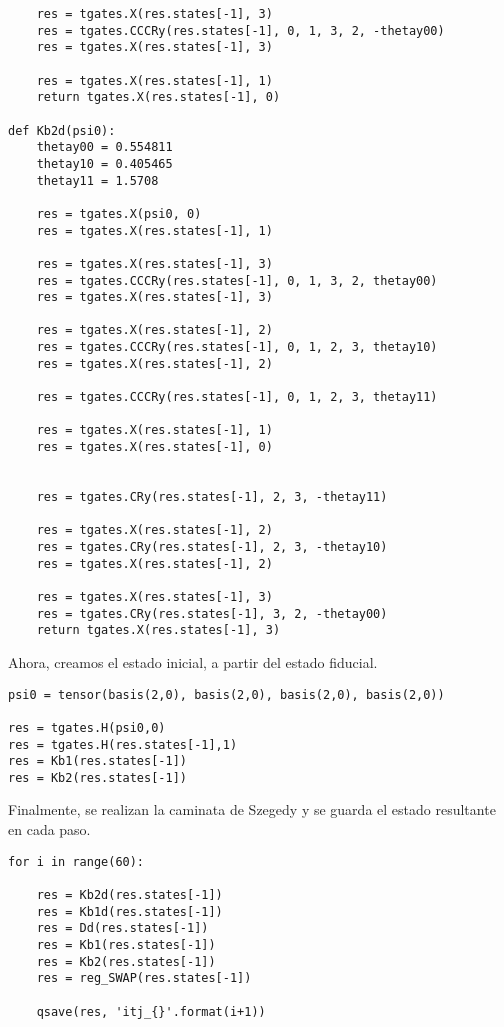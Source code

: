\begin{verbatim}
    res = tgates.X(res.states[-1], 3)
    res = tgates.CCCRy(res.states[-1], 0, 1, 3, 2, -thetay00)
    res = tgates.X(res.states[-1], 3)

    res = tgates.X(res.states[-1], 1)
    return tgates.X(res.states[-1], 0)

def Kb2d(psi0):
    thetay00 = 0.554811
    thetay10 = 0.405465
    thetay11 = 1.5708

    res = tgates.X(psi0, 0)
    res = tgates.X(res.states[-1], 1)

    res = tgates.X(res.states[-1], 3)
    res = tgates.CCCRy(res.states[-1], 0, 1, 3, 2, thetay00)
    res = tgates.X(res.states[-1], 3)

    res = tgates.X(res.states[-1], 2)
    res = tgates.CCCRy(res.states[-1], 0, 1, 2, 3, thetay10)
    res = tgates.X(res.states[-1], 2)

    res = tgates.CCCRy(res.states[-1], 0, 1, 2, 3, thetay11)

    res = tgates.X(res.states[-1], 1)
    res = tgates.X(res.states[-1], 0)


    res = tgates.CRy(res.states[-1], 2, 3, -thetay11)

    res = tgates.X(res.states[-1], 2)
    res = tgates.CRy(res.states[-1], 2, 3, -thetay10)
    res = tgates.X(res.states[-1], 2)

    res = tgates.X(res.states[-1], 3)
    res = tgates.CRy(res.states[-1], 3, 2, -thetay00)
    return tgates.X(res.states[-1], 3)
\end{verbatim}

Ahora, creamos el estado inicial, a partir del estado fiducial.

\begin{verbatim}
psi0 = tensor(basis(2,0), basis(2,0), basis(2,0), basis(2,0))

res = tgates.H(psi0,0)
res = tgates.H(res.states[-1],1)
res = Kb1(res.states[-1])
res = Kb2(res.states[-1])
\end{verbatim}

Finalmente, se realizan la caminata de Szegedy y se guarda el estado resultante en cada paso.

\begin{verbatim}
for i in range(60):
    
    res = Kb2d(res.states[-1])
    res = Kb1d(res.states[-1])
    res = Dd(res.states[-1])
    res = Kb1(res.states[-1])
    res = Kb2(res.states[-1])
    res = reg_SWAP(res.states[-1])
    
    qsave(res, 'itj_{}'.format(i+1))
\end{verbatim}


